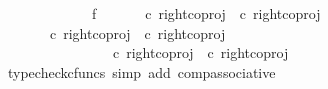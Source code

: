 \begin{isabellebody}
\ \ \ \ \ \ \isanewline
\ \ \isamarkupfalse%
\isanewline
\ \ \isamarkupfalse%
\ f{}{\isacharcolon}{\kern0pt}\ {\isachardoublequoteopen}{\isasymlangle}{\isasymt}{\isacharcomma}{\kern0pt}{\isasymt}{\isasymrangle}\ {\isasymamalg}\ {\isasymlangle}{\isasymf}{\isacharcomma}{\kern0pt}\ {\isasymf}{\isasymrangle}\ {\isasymamalg}\ {\isasymlangle}{\isasymf}{\isacharcomma}{\kern0pt}{\isasymt}{\isasymrangle}\ {\isasymcirc}\isactrlsub c\ {\isacharparenleft}{\kern0pt}right{\isacharunderscore}{\kern0pt}coproj\ {\isasymone}\ {\isacharparenleft}{\kern0pt}{\isasymone}{\isasymCoprod}{\isasymone}{\isacharparenright}{\kern0pt}{\isasymcirc}\isactrlsub c\ right{\isacharunderscore}{\kern0pt}coproj\ {\isasymone}\ {\isasymone}{\isacharparenright}{\kern0pt}\ {\isacharequal}{\kern0pt}\ {\isasymlangle}{\isasymf}{\isacharcomma}{\kern0pt}{\isasymt}{\isasymrangle}{\isachardoublequoteclose}\isanewline
\ \ \isamarkupfalse%
{\isacharminus}{\kern0pt}\ \isanewline
\ \ \ \ \isamarkupfalse%
\ {\isachardoublequoteopen}{\isasymlangle}{\isasymt}{\isacharcomma}{\kern0pt}{\isasymt}{\isasymrangle}\ {\isasymamalg}\ {\isasymlangle}{\isasymf}{\isacharcomma}{\kern0pt}\ {\isasymf}{\isasymrangle}\ {\isasymamalg}\ {\isasymlangle}{\isasymf}{\isacharcomma}{\kern0pt}{\isasymt}{\isasymrangle}\ {\isasymcirc}\isactrlsub c\ right{\isacharunderscore}{\kern0pt}coproj\ {\isasymone}\ {\isacharparenleft}{\kern0pt}{\isasymone}{\isasymCoprod}{\isasymone}{\isacharparenright}{\kern0pt}{\isasymcirc}\isactrlsub c\ right{\isacharunderscore}{\kern0pt}coproj\ {\isasymone}\ {\isasymone}\ {\isacharequal}{\kern0pt}\ \isanewline
\ \ \ \ \ \ \ \ \ \ {\isacharparenleft}{\kern0pt}{\isasymlangle}{\isasymt}{\isacharcomma}{\kern0pt}{\isasymt}{\isasymrangle}\ {\isasymamalg}\ {\isasymlangle}{\isasymf}{\isacharcomma}{\kern0pt}\ {\isasymf}{\isasymrangle}\ {\isasymamalg}\ {\isasymlangle}{\isasymf}{\isacharcomma}{\kern0pt}{\isasymt}{\isasymrangle}\ {\isasymcirc}\isactrlsub c\ right{\isacharunderscore}{\kern0pt}coproj\ {\isasymone}\ {\isacharparenleft}{\kern0pt}{\isasymone}{\isasymCoprod}{\isasymone}{\isacharparenright}{\kern0pt}{\isacharparenright}{\kern0pt}{\isasymcirc}\isactrlsub c\ right{\isacharunderscore}{\kern0pt}coproj\ {\isasymone}\ {\isasymone}{\isachardoublequoteclose}\isanewline
\ \ \ \ \ \ \isamarkupfalse%
\ {\isacharparenleft}{\kern0pt}typecheck{\isacharunderscore}{\kern0pt}cfuncs{\isacharcomma}{\kern0pt}\ simp\ add{\isacharcolon}{\kern0pt}\ comp{\isacharunderscore}{\kern0pt}associative{}{\isacharparenright}{\kern0pt}\isanewline

\end{isabellebody}

